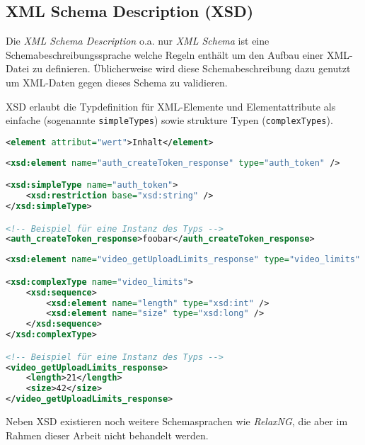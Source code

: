 \subsection{XML Schema Description (XSD)}

Die \emph{XML Schema Description} o.a. nur \emph{XML Schema} ist eine Schemabeschreibungssprache welche Regeln enthält um den Aufbau einer XML-Datei zu definieren. Üblicherweise wird diese Schemabeschreibung dazu genutzt um XML-Daten gegen dieses Schema zu validieren.

\gls{XSD} erlaubt die Typdefinition für XML-Elemente und Elementattribute als einfache (sogenannte \texttt{simpleTypes}) sowie strukture Typen (\texttt{complexTypes}).

\begin{lstlisting}[language=XML, caption=Minimalbeispiel für ein XML-Element]
<element attribut="wert">Inhalt</element>
\end{lstlisting}

\begin{lstlisting}[language=XML, label=lst:simple, caption=Beispiel für einen einfachen Schematyp \cite{facebookXSD}]
<xsd:element name="auth_createToken_response" type="auth_token" />

<xsd:simpleType name="auth_token">
    <xsd:restriction base="xsd:string" />
</xsd:simpleType>

<!-- Beispiel für eine Instanz des Typs -->
<auth_createToken_response>foobar</auth_createToken_response>
\end{lstlisting}

\begin{lstlisting}[language=XML, label=lst:complex, caption=Beispiel für einen strukturierten Schematyp \cite{facebookXSD}]
<xsd:element name="video_getUploadLimits_response" type="video_limits" />

<xsd:complexType name="video_limits">
    <xsd:sequence>
        <xsd:element name="length" type="xsd:int" />
        <xsd:element name="size" type="xsd:long" />
    </xsd:sequence>
</xsd:complexType>

<!-- Beispiel für eine Instanz des Typs -->
<video_getUploadLimits_response>
    <length>21</length>
    <size>42</size>
</video_getUploadLimits_response>
\end{lstlisting}

Neben \gls{XSD} existieren noch weitere Schemasprachen wie \emph{RelaxNG}, die aber im Rahmen dieser Arbeit nicht behandelt werden.